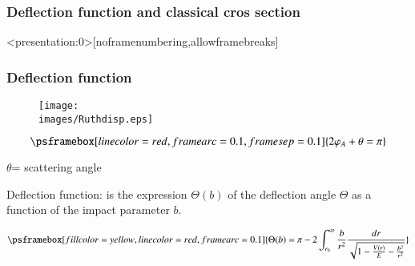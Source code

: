 \documentclass[english,10pt]{beamer}
\newcommand{\images}{images}
\begin{document}
\subsubsection{Deflection function and classical cros section}
\begin{frame}<presentation:0>[noframenumbering,allowframebreaks]
\frametitle{Deflection function}

\begin{minipage}[t]{.45\textwidth}
\begin{figure}{\par \resizebox*{0.85\textwidth}{!}
{\texttt{[image: \\images/Ruthdisp.eps]}} \par}
\end{figure}
\end{minipage}
\begin{minipage}[t]{.45\textwidth}


$$
\psframebox[linecolor=red,framearc=0.1,framesep=0.1]{
2 \varphi_A + \theta = \pi 
}%
$$

\begin{center}$\theta$= scattering  angle \end{center}
\end{minipage}

\bigskip

{\verde Deflection function:} is the  expression  $\Theta(b)$ of the deflection angle $\Theta$ as a function of the impact parameter $b$. 


\begin{equation}
\psframebox[fillcolor=yellow,linecolor=red,framearc=0.1]{
\nonumber
\Theta(b) = \pi -2 \int_{r_0}^{\infty} \frac{b}{r^2}\frac{dr}{\sqrt{1 - \frac{V(r)}{E} - \frac{b^2}{r^2}}}
}%
\end{equation}
\end{frame}



\end{document}

